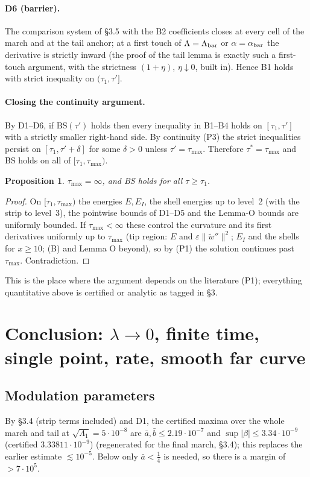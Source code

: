 \documentclass[11pt]{article}
\newtheorem{proposition}[theorem]{Proposition}
\theoremstyle{definition}
\theoremstyle{remark}
\newcommand{\norm}[1]{\lVert #1\rVert}
\begin{document}
\paragraph{D6 (barrier).} The comparison system of \S3.5 with the B2 coefficients closes at every cell of the march and at the tail anchor; at a first touch of $\Lambda=\Lambda_{\rm bar}$ or $\alpha=\alpha_{\rm bar}$ the derivative is strictly inward (the proof of the tail lemma is exactly such a first-touch argument, with the strictness $(1+\eta)$, $\eta\downarrow0$, built in). Hence B1 holds with strict inequality on $(\tau_1,\tau']$.

\paragraph{Closing the continuity argument.} By D1--D6, if $\mathrm{BS}(\tau')$ holds then every inequality in B1--B4 holds on $[\tau_1,\tau']$ with a strictly smaller right-hand side. By continuity (P3) the strict inequalities persist on $[\tau_1,\tau'+\delta]$ for some $\delta>0$ unless $\tau'=\tau_{\max}$. Therefore $\tau^\ast=\tau_{\max}$ and BS holds on all of $[\tau_1,\tau_{\max})$.

\begin{proposition}\label{prop:global}
$\tau_{\max}=\infty$, and BS holds for all $\tau\ge\tau_1$.
\end{proposition}
\begin{proof}
On $[\tau_1,\tau_{\max})$ the energies $E,E_I$, the shell energies up to level~2 (with the strip to level~3), the pointwise bounds of D1--D5 and the Lemma-O bounds are uniformly bounded. If $\tau_{\max}<\infty$ these control the curvature and its first derivatives uniformly up to $\tau_{\max}$ (tip region: $E$ and $\varepsilon\norm{\tilde w''}^2$; $E_I$ and the shells for $x\ge10$; (B) and Lemma O beyond), so by (P1) the solution continues past $\tau_{\max}$. Contradiction.
\end{proof}
\noindent This is the place where the argument depends on the literature (P1); everything quantitative above is certified or analytic as tagged in \S3.

\section{Conclusion: $\lambda\to0$, finite time, single point, rate, smooth far curve}

\subsection{Modulation parameters}
By \S3.4 (strip terms included) and D1, the certified maxima over the whole march and tail at $\sqrt{\Lambda_1}=5\cdot10^{-8}$ are $\bar a,\bar b\le2.19\cdot10^{-7}$ and $\sup|\beta|\le3.34\cdot10^{-9}$ (certified $3.33811\cdot10^{-9}$) (regenerated for the final march, \S3.4); this replaces the earlier estimate $\lesssim10^{-5}$. Below only $\bar a<\tfrac14$ is needed, so there is a margin of $>7\cdot10^5$.
\end{document}
